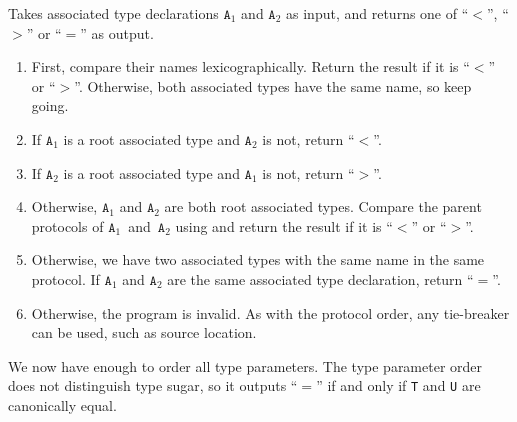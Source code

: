 \documentclass[../generics]{subfiles}
\begin{document}
%
\begin{algorithm}\label{associated type order}%
Takes associated type declarations $\texttt{A}_1$ and $\texttt{A}_2$ as input, and returns one of ``$<$'', ``$>$'' or ``$=$'' as output.
\begin{enumerate}
\item First, compare their names lexicographically. Return the result if it is ``$<$'' or ``$>$''. Otherwise, both associated types have the same name, so keep going.
\item If $\texttt{A}_1$ is a root associated type and $\texttt{A}_2$ is not, return ``$<$''.
\item If $\texttt{A}_2$ is a root associated type and $\texttt{A}_1$ is not, return ``$>$''.
\item Otherwise, $\texttt{A}_1$ and $\texttt{A}_2$ are both root associated types. Compare the parent protocols of $\texttt{A}_1$~and~$\texttt{A}_2$ using  and return the result if it is ``$<$'' or ``$>$''.
\item Otherwise, we have two associated types with the same name in the same protocol. If $\texttt{A}_1$ and $\texttt{A}_2$ are the same associated type declaration, return ``$=$''.
\item Otherwise, the program is invalid. As with the protocol order, any tie-breaker can be used, such as source location.
\end{enumerate}
\end{algorithm}

We now have enough to order all type parameters. The type parameter order does not distinguish type sugar, so it outputs ``$=$'' if and only if \texttt{T} and \texttt{U} are canonically equal.
\end{document}
